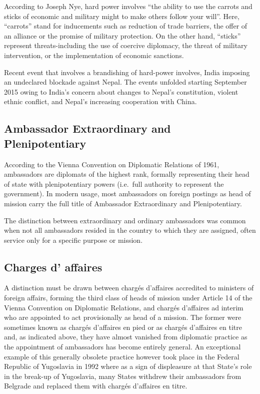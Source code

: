 \documentclass[
  openany]{book}
\begin{document}
According to Joseph Nye, hard power involves ``the ability to use the carrots and sticks of economic and military might to make others follow your will''. Here, ``carrots'' stand for inducements such as reduction of trade barriers, the offer of an alliance or the promise of military protection. On the other hand, ``sticks'' represent threats-including the use of coercive diplomacy, the threat of military intervention, or the implementation of economic sanctions.

Recent event that involves a brandishing of hard-power involves, India imposing an undeclared blockade against Nepal. The events unfolded starting September 2015 owing to India's concern about changes to Nepal's constitution, violent ethnic conflict, and Nepal's increasing cooperation with China.

\hypertarget{ambassador-extraordinary-and-plenipotentiary}{%
\subsection{Ambassador Extraordinary and Plenipotentiary}\label{ambassador-extraordinary-and-plenipotentiary}}

According to the Vienna Convention on Diplomatic Relations of 1961, ambassadors are diplomats of the highest rank, formally representing their head of state with plenipotentiary powers (i.e.~full authority to represent the government). In modern usage, most ambassadors on foreign postings as head of mission carry the full title of Ambassador Extraordinary and Plenipotentiary.

The distinction between extraordinary and ordinary ambassadors was common when not all ambassadors resided in the country to which they are assigned, often service only for a specific purpose or mission.

\hypertarget{charges-d-affaires}{%
\subsection{Charges d' affaires}\label{charges-d-affaires}}

A distinction must be drawn between chargés d'affaires accredited to ministers of foreign affairs, forming the third class of heads of mission under Article 14 of the Vienna Convention on Diplomatic Relations, and chargés d'affaires ad interim who are appointed to act provisionally as head of a mission. The former were sometimes known as chargés d'affaires en pied or as chargés d'affaires en titre and, as indicated above, they have almost vanished from diplomatic practice as the appointment of ambassadors has become entirely general. An exceptional example of this generally obsolete practice however took place in the Federal Republic of Yugoslavia in 1992 where as a sign of displeasure at that State's role in the break-up of Yugoslavia, many States withdrew their ambassadors from Belgrade and replaced them with chargés d'affaires en titre.
\end{document}
